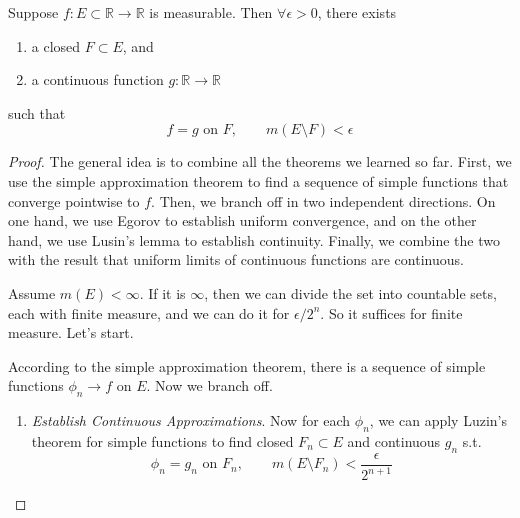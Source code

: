   \begin{theorem}[Luzin]
    Suppose $f: E \subset \mathbb{R} \to \mathbb{R}$ is measurable. Then $\forall \epsilon > 0$, there exists 
    \begin{enumerate}
      \item a closed $F \subset E$, and 
      \item a continuous function $g: \mathbb{R} \to \mathbb{R}$
    \end{enumerate}
    such that 
    \begin{equation}
      f = g \text{ on } F, \qquad m(E \setminus F) < \epsilon
    \end{equation}
  \end{theorem}
  \begin{proof}
    The general idea is to combine all the theorems we learned so far. First, we use the simple approximation theorem to find a sequence of simple functions that converge pointwise to $f$. Then, we branch off in two independent directions. On one hand, we use Egorov to establish uniform convergence, and on the other hand, we use Lusin's lemma to establish continuity. Finally, we combine the two with the result that uniform limits of continuous functions are continuous. 

    Assume $m(E) < \infty$. If it is $\infty$, then we can divide the set into countable sets, each with finite measure, and we can do it for $\epsilon/2^{n}$. So it suffices for finite measure. Let's start. 

    According to the simple approximation theorem, there is a sequence of simple functions $\phi_n \to f$ on $E$. Now we branch off. 
    \begin{enumerate}
      \item \textit{Establish Continuous Approximations}. Now for each $\phi_n$, we can apply Luzin's theorem for simple functions to find closed $F_n \subset E$ and continuous $g_n$ s.t. 
      \begin{equation}
        \phi_n = g_n \text{ on } F_n, \qquad m(E \setminus F_n) < \frac{\epsilon}{2^{n+1}} 
      \end{equation}


\end{enumerate}
\end{proof}
